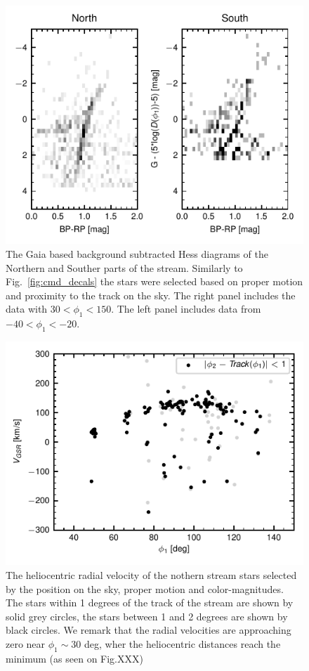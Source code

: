 \documentclass[a4paper,useAMS,usenatbib]{mnras}
\begin{document}
%
\begin{figure}
\includegraphics{gaia_cmd.pdf}
\caption{The Gaia based background subtracted Hess diagrams of the
  Northern and Souther parts of the stream. Similarly to
  Fig.~\ref{fig:cmd_decals} the stars were selected based on proper
  motion and proximity to the track on the sky. The right panel
  includes the data with $30<\phi_1<150$. The left panel includes data
  from $-40<\phi_1<-20$.}
\label{fig:cmd_gaia}
\end{figure}
%

%
\begin{figure}
\includegraphics{orphan_spec.pdf}
\caption{The heliocentric radial velocity of the nothern stream stars
  selected by the position on the sky, proper motion and
  color-magnitudes.  The stars within 1 degrees of the track of the
  stream are shown by solid grey circles, the stars between 1 and 2
  degrees are shown by black circles. We remark that the radial
  velocities are approaching zero near $\phi_1 \sim 30 $ deg, wher the
  heliocentric distances reach the minimum (as seen on Fig.XXX)}
\label{fig:hrv}
\end{figure}
\end{document}
